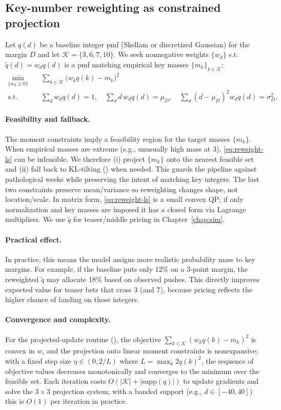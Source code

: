 \subsection{Key-number reweighting as constrained projection}\label{subsec:key-reweight}
Let $q(d)$ be a baseline integer pmf (Skellam or discretized Gaussian) for the margin $D$ and let
$\mathcal{K}=\{3,6,7,10\}$. We seek nonnegative weights $\{w_d\}$ s.t. $\tilde q(d)=w_d q(d)$ is a
pmf matching empirical key masses $\{m_k\}_{k\in\mathcal{K}}$:
\begin{align}\label{eq:reweight-ls}
\min_{\{w_d\ge0\}} \quad & \sum_{k\in\mathcal{K}} \big(w_k q(k)-m_k\big)^2 \\
\text{s.t.}\quad &
\sum_{d} w_d q(d)=1,\quad
\sum_d d\,w_d q(d)=\mu_D,\quad
\sum_d (d-\mu_D)^2 w_d q(d)=\sigma_D^2. \nonumber
\end{align}
\paragraph{Feasibility and fallback.} The moment constraints imply a feasibility region for the target masses $\{m_k\}$. When empirical masses are extreme (e.g., unusually high mass at 3), \eqref{eq:reweight-ls} can be infeasible. We therefore (i) project $\{m_k\}$ onto the nearest feasible set and (ii) fall back to KL‑tilting () when needed. This guards the pipeline against pathological weeks while preserving the intent of matching key integers.
The last two constraints preserve mean/variance so reweighting changes shape, not location/scale.
In matrix form, \eqref{eq:reweight-ls} is a small convex QP; if only normalization and key masses
are imposed it has a closed form via Lagrange multipliers. We use $\tilde q$ for teaser/middle pricing in Chapter~\ref{chap:sim}.

\paragraph{Practical effect.} In practice, this means the model assigns more realistic probability mass to key margins. For example, if the baseline puts only 12\% on a 3‑point margin, the reweighted $\tilde q$ may allocate 18\% based on observed pushes. This directly improves expected value for teaser bets that cross 3 (and 7), because pricing reflects the higher chance of landing on those integers.

\paragraph{Convergence and complexity.} For the projected‑update routine (), the objective $\sum_{k\in\mathcal K}(w_k q(k)-m_k)^2$ is convex in $w$, and the projection onto linear moment constraints is nonexpansive; with a fixed step size $\eta\in(0,2/L)$ where $L=\max_k 2 q(k)^2$, the sequence of objective values decreases monotonically and converges to the minimum over the feasible set. Each iteration costs $O(|\mathcal K|+|\mathrm{supp}(q)|)$ to update gradients and solve the $3\times3$ projection system; with a banded support (e.g., $d\in[-40,40]$) this is $O(1)$ per iteration in practice.


